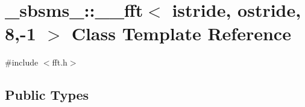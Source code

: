 \hypertarget{class__sbsms___1_1____fft_3_01istride_00_01ostride_00_018_00-1_01_4}{}\section{\+\_\+sbsms\+\_\+\+:\+:\+\_\+\+\_\+fft$<$ istride, ostride, 8,-\/1 $>$ Class Template Reference}
\label{class__sbsms___1_1____fft_3_01istride_00_01ostride_00_018_00-1_01_4}


{\ttfamily \#include $<$fft.\+h$>$}

\subsection*{Public Types}
